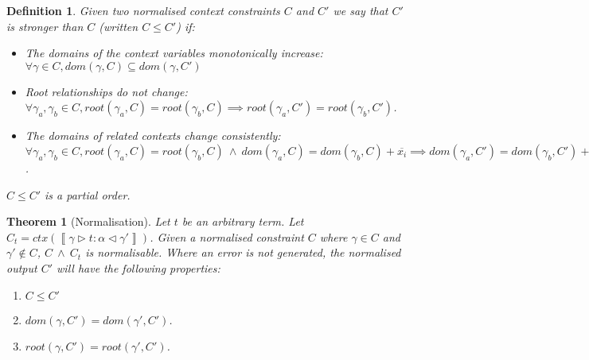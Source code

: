 \documentclass[preprint]{sigplanconf}
\newtheorem{thm}{Theorem}
\newtheorem{defn}{Definition}
\newcommand{\inferlhs}[1]{\left\llbracket \gamma \triangleright #1 : \alpha \triangleleft \gamma' \right\rrbracket}
\newcommand{\cand}{\:\wedge\:}
\begin{document}
\begin{defn}
Given two normalised context constraints $C$ and $C'$ we say that
$C'$ is {\it stronger} than $C$ (written $C \leq C'$) if:

\begin{itemize}
\item The domains of the context variables monotonically increase: 
$\forall \gamma \in C, dom(\gamma, C) \subseteq dom(\gamma, C')$
\item Root relationships do not change: 
$\forall \gamma_a, \gamma_b \in C, root(\gamma_a, C) = root(\gamma_b, C) \implies root(\gamma_a, C') = root(\gamma_b, C')$.
\item The domains of related contexts change consistently:
$\forall \gamma_a, \gamma_b \in C, root(\gamma_a, C) = root(\gamma_b, C) \cand dom(\gamma_a, C) = dom(\gamma_b, C) + \overline{x_i} \implies dom(\gamma_a, C') = dom(\gamma_b, C') + \overline{x_i}$.
\end{itemize}

$C \leq C'$ is a partial order.

\end{defn}


\begin{thm}[Normalisation]
\label{thm:ctx_norm}
Let $t$ be an arbitrary term. Let $C_t = ctx(\inferlhs{t})$.
Given a normalised constraint $C$ where $\gamma \in C$ and $\gamma' \notin C$,
$C \cand C_t$ is normalisable. Where an error is not generated, the normalised
output $C'$ will have the following properties:

\begin{enumerate}
\item $C \leq C'$
\item $dom(\gamma, C') = dom(\gamma', C')$.
\item $root(\gamma, C') = root(\gamma', C')$.
\end{enumerate}

\end{thm}
\end{document}
